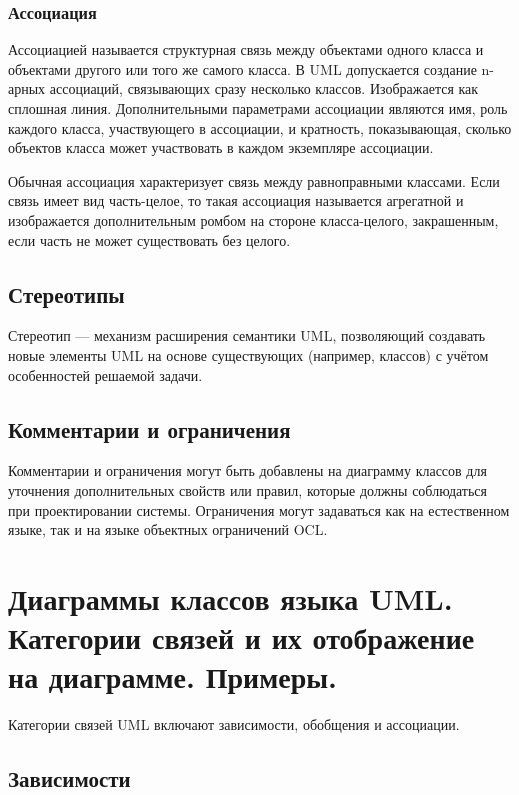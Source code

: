 \documentclass[a4paper,12pt]{article}
\begin{document}
\subsubsection{Ассоциация}

Ассоциацией называется структурная связь между объектами одного класса и объектами другого или того же самого класса. В UML допускается создание n-арных ассоциаций, связывающих сразу несколько классов. Изображается как сплошная линия. Дополнительными параметрами ассоциации являются имя, роль каждого класса, участвующего в ассоциации, и кратность, показывающая, сколько объектов класса может участвовать в каждом экземпляре ассоциации.

Обычная ассоциация характеризует связь между равноправными классами. Если связь имеет вид часть-целое, то такая ассоциация называется агрегатной и изображается дополнительным ромбом на стороне класса-целого, закрашенным, если часть не может существовать без целого.

\subsection{Стереотипы}

Стереотип — механизм расширения семантики UML, позволяющий создавать новые элементы UML на основе существующих (например, классов) с учётом особенностей решаемой задачи.

\subsection{Комментарии и ограничения}

Комментарии и ограничения могут быть добавлены на диаграмму классов для уточнения дополнительных свойств или правил, которые должны соблюдаться при проектировании системы. Ограничения могут задаваться как на естественном языке, так и на языке объектных ограничений OCL.

\section{Диаграммы классов языка UML. Категории связей и их отображение на диаграмме. Примеры.}

Категории связей UML включают зависимости, обобщения и ассоциации.

\subsection{Зависимости}
\end{document}
